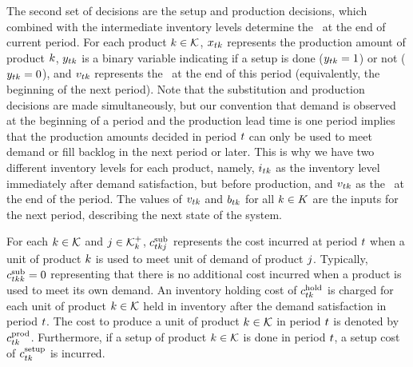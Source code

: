\documentclass[msom]{oo}
\begin{document}
The second set of decisions are the setup and production decisions, which combined with the intermediate inventory  levels determine the \InvPos \ at the end of current period. For each product $k \in \mathcal{K}$, $x_{t k}$ represents the production amount of product $k$, $y_{t k}$ is a binary variable indicating if a setup is done ($y_{t k} = 1$) or not ($y_{t k} = 0$), and $v_{t k}$ represents the \InvPos\ at the end of this period (equivalently, the beginning of the next period). 
Note that the substitution and production decisions are made simultaneously, but our convention that demand is observed at the beginning of a period and the production lead time is one period implies that the production amounts decided in period $t$ can only be used to meet demand or fill backlog in the next period or later.  This is why we have two different inventory levels for each product, namely, $i_{t k}$ as the inventory level immediately after demand satisfaction, but before production, and $v_{t k}$ as the \InvPos\ at the end of the period. 
The values of $v_{t k}$ and $b_{t k}$ for all $k \in K$ are the inputs for the next period, describing the next state of the system.

For each $k \in \mathcal{K}$ and $j \in \mathcal{K}^+_k$, $c^{\text{sub}}_{t k j }$ represents the cost incurred at period $t$ when a unit of product $k$ is used to meet unit of demand of product $j$. Typically, $c^{\text{sub}}_{t k k} = 0$ representing that there is no additional cost incurred when a product is used to meet its own demand.
 An inventory holding cost of $c^{\text{hold}}_{t k}$ is charged for each unit of product $k \in \mathcal{K}$ held in inventory after the demand satisfaction in period $t$. The cost to produce a unit of product $k \in \mathcal{K}$ in period $t$ is denoted by $c^{\text{prod}}_{t k}$. Furthermore, if a setup of product $k \in \mathcal{K}$ is done in period $t$, a setup cost of $c^{\text{setup}}_{t k}$ is incurred. 
\end{document}
